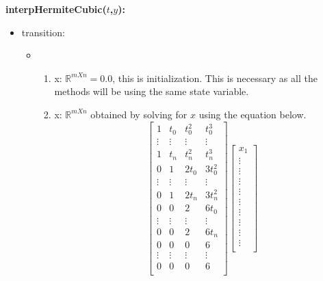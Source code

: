 \documentclass[12pt, titlepage]{article}
\begin{document}
\noindent \textbf{interpHermiteCubic($t$,$y$):}
\begin{itemize}
	\item transition: 
	
	\begin{itemize}
		\item 
		\begin{enumerate}
			\item x: $\mathbb{R}^{m X n} = 0.0 $, this is initialization. 
			This is necessary as all the methods will be using the same state 
			variable.
			
			\item x: $\mathbb{R}^{m X n}$ obtained by solving for $x$ using 
			the equation below.
		\begin{equation*}
		\begin{bmatrix}
		1          & t_0       & t_0 ^{2}         & t_0 ^{3}         \\
		\vdots     & \vdots    & \vdots           & \vdots            \\
		1          & t_n       & t_n ^{2}         & t_n ^{3}          \\
		0          & 1         & 2 t_0            & 3 t_0 ^{2}         \\
		\vdots     & \vdots    & \vdots           & \vdots            \\
		0          & 1         & 2 t_n            & 3 t_n ^{2}          \\
		0          & 0         & 2                & 6 t_0              \\
		\vdots     & \vdots    & \vdots           & \vdots            \\
		0          & 0         & 2                & 6 t_n           \\
		0          & 0         & 0                & 6                 \\
		\vdots     & \vdots    & \vdots           & \vdots            \\
		0          & 0         & 0                & 6               \\
		\end{bmatrix}
		\begin{bmatrix}
		x_1  \\
		\vdots \\
		\vdots \\
		\vdots \\
		\vdots \\
		\vdots \\
		\vdots \\
		\vdots \\
		\vdots \\
		\vdots \\
		

\end{bmatrix}
\end{equation*}
\end{enumerate}
\end{itemize}
\end{itemize}
\end{document}
